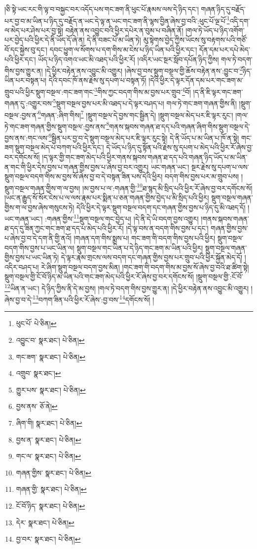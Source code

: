 །ཅི་སྟེ་ཡང་རང་གི་ལྟ་བ་བསྐྱང་བར་འདོད་པས་གང་ཟག་ནི་ཕུང་པོ་རྣམས་ལས་དེ་ཉིད་དང་། གཞན་ཉིད་དུ་བརྗོད་པར་བྱ་བ་མ་ཡིན་པ་ཉིད་དུ་བརྗོད་ན་ཡང་དེ་ལྟ་ན་ཡང་གང་ཟག་ནི་ལྷས་བྱིན་ཞེས་བྱ་བའི་:ཕུང་པོ་ལྔ་པོ་\footnote{ཕུང་པོ་  པེ་ཅིན། }འདི་དག་ལ་མེད་པར་ཤེས་པར་བྱ་སྟེ། བརྟེན་ནས་འབྱུང་བའི་ཕྱིར་དཔེར་ན་བུམ་པ་བཞིན་ནོ། །གལ་ཏེ་ཡོད་པ་ཉིད་འགོག་པར་བྱེད་པའི་ཕྱིར་དེ་ནི་ཡོད་དོ་ཞེ་ན། དེ་ནི་བཟང་པོ་མ་ཡིན་ཏེ། མུ་སྟེགས་བྱེད་ཀྱིས་ཡོངས་སུ་བརྟགས་པའི་གཙོ་བོ་དང་སྐྱེས་བུ་དང་། དབང་ཕྱུག་ལ་སོགས་པ་དག་གིས་མ་ངེས་པ་ཉིད་ཡིན་པའི་ཕྱིར་དང་། དོན་དམ་པར་དཔེ་མེད་པའི་ཕྱིར་དང་། ཡོད་པ་ཉིད་འགའ་ཡང་མི་འཐད་པའི་ཕྱིར་རོ། །འདིར་ཡང་སྔར་སློབ་དཔོན་ཉིད་ཀྱིས། གལ་ཏེ་བདག་གིས་བྱས་གྱུར་ན། །དེ་ཕྱིར་བརྟེན་ནས་འབྱུང་མི་འགྱུར། །ཞེས་བྱ་བས་སྡུག་བསྔལ་གྱི་ཆོས་བརྟེན་ནས་:བྱུང་བ་\footnote{འབྱུང་བ་  སྣར་ཐང་།  པེ་ཅིན། }ཉིད་ཡིན་པར་བསྟན་པ། དེའི་དབང་ཁོ་ནས་རྗེས་སུ་དཔག་པ་བསྟན་ཏོ། །དེའི་ཕྱིར་དེ་ལྟར་དོན་དམ་པར་གང་ཟག་མ་གྲུབ་པའི་ཕྱིར་སྡུག་བསྔལ་:གང་ཟག་གང་\footnote{གང་ཟག་  སྣར་ཐང་།  པེ་ཅིན། }གིས་ཀྱང་བདག་གིས་མ་བྱས་པར་གྲུབ་\footnote{འགྲུབ་  སྣར་ཐང་། }བོ། །ད་ནི་ཇི་ལྟར་གང་ཟག་གཞན་དུ་:འགྱུར་བས་\footnote{གྱུར་པས་  སྣར་ཐང་།  པེ་ཅིན། }སྡུག་བསྔལ་བྱས་པར་མི་འཐད་པ་དེ་ལྟར་བཤད་པ། གལ་ཏེ་གང་ཟག་གཞན་གྱིས་ནི། །སྡུག་བསྔལ་:བྱས་ན་\footnote{བྱས་ནས་  ཅོ་ནེ། }གཞན་:ཞིག་གིས།\footnote{ཞིག་གི།  སྣར་ཐང་།  པེ་ཅིན། } །སྡུག་བསྔལ་དེ་བྱས་གང་སྦྱིན་དེ། །སྡུག་བསྔལ་མེད་པར་ཇི་ལྟར་རུང་། །གལ་ཏེ་གང་ཟག་གཞན་གྱིས་སྡུག་བསྔལ་:བྱས་ནས་\footnote{བྱས་ན་  སྣར་ཐང་།  པེ་ཅིན། }གནས་སྐབས་གཞན་ཐ་དད་པའི་གཞན་ཞིག་གིས་སྡུག་བསྔལ་དེ་བྱས་ནས་:གང་ལས་\footnote{གང་ལ་  སྣར་ཐང་།  པེ་ཅིན། }སྦྱིན་པར་བྱ་བ་དེ་སྡུག་བསྔལ་མེད་པར་ཇི་ལྟར་རུང་སྟེ། དེ་ནི་ཡོད་པ་མ་ཡིན་པ་ཁོ་ན་སྟེ། གང་ཟག་སྡུག་བསྔལ་མེད་པ་བཀག་པའི་ཕྱིར་དང་། དེ་ཡོད་པ་ཉིད་དུ་སྟོན་པའི་རྗེས་སུ་དཔག་པ་མེད་པའི་ཕྱིར་རོ་ཞེས་བྱ་བར་དགོངས་སོ། །ད་ལྟར་གྱི་གང་ཟག་མེད་པའི་ཕྱིར་གནས་སྐབས་གཞན་ཐ་དད་པའི་གཞན་ཉིད་ཡོད་པ་མ་ཡིན་ན་གང་གི་ཕྱིར་དེས་བྱས་པ་གཞན་གྱིས་བྱས་པ་ཞེས་བྱ་བར་འགྱུར། ཡང་གཞན་ཡང་། སྔར་རྗེས་སུ་དཔག་པ་ལས་སྡུག་བསྔལ་བདག་གིས་མ་བྱས་སོ་ཞེས་བྱ་བ་དེ་བསྟན་ཟིན་པས་དེའི་ཕྱིར། བདག་གིས་བྱས་པར་མ་གྲུབ་པས། །སྡུག་བསྔལ་གཞན་གྱིས་ག་ལ་བྱས། །མ་བྱས་པ་ལ་:གཞན་གྱི་\footnote{གཞན་གྱིས་  སྣར་ཐང་།  པེ་ཅིན། }ཐ་སྙད་མི་སྲིད་པའི་ཕྱིར་རོ་ཞེས་བྱ་བར་དགོངས་སོ། །ཡང་ན་རྒྱུད་སོ་སོར་ངེས་པ་ལ་ལས་རྣམ་པར་སྨིན་པ་ཅན་གཞན་གྱིས་བྱེད་པ་མི་སྲིད་པའི་ཕྱིར། སྡུག་བསྔལ་གཞན་གྱིས་ག་ལ་བྱས་ཞེས་གསུངས་ཏེ། དེའི་ཕྱིར་དེ་ལྟར་སྡུག་བསྔལ་བདག་དང་གཞན་གྱིས་བྱས་པ་ཉིད་དུ་མི་འཐད་དོ། །ཡང་གཞན་ཡང་། :གཞན་གྱིས་\footnote{གཞན་གྱི་  སྣར་ཐང་།  པེ་ཅིན། }སྡུག་བསྔལ་གང་བྱེད་པ། །དེ་ནི་དེ་ཡི་བདག་བྱས་འགྱུར། །གནས་སྐབས་གཞན་ཐ་དད་དུ་ཟིན་ཀྱང་གང་ཟག་ཐ་དད་པ་མེད་པའི་ཕྱིར་རོ། །དེ་ལྟ་བས་ན་བདག་གིས་བྱས་པ་དང་། གཞན་གྱིས་བྱས་པ་ཞེས་བྱ་བ་དེ་དག་ནི་གྱི་ནའོ། །གཞན་དག་གིས་སྨྲས་པ། གང་ཟག་གི་བདག་གིས་བྱས་པའི་ཕྱིར། སྡུག་བསྔལ་བདག་གིས་བྱས་པ་ཡང་ཡིན་ལ། སྡུག་བསྔལ་གང་ཡིན་པ་དེ་ཉིད་གང་ཟག་མ་ཡིན་པའི་ཕྱིར། སྡུག་བསྔལ་གཞན་གྱིས་བྱས་པ་ཡང་ཡིན་ཏེ། དེ་ལྟར་རྣམ་གྲངས་ལས་བདག་དང་གཞན་གྱིས་བྱས་པར་གྲུབ་པའི་ཕྱིར་སྐྱོན་མེད་དོ། །འདིར་བཤད་པ། རེ་ཞིག་སྡུག་བསྔལ་བདག་བྱས་མིན། །གང་ཟག་གི་བདག་གིས་མ་བྱས་སོ་ཞེས་བྱ་བའི་ཐ་ཚིག་སྟེ། སྡུག་བསྔལ་གྱི་ངོ་བོ་ཉིད་མ་ཡིན་པའི་གང་ཟག་མེད་པའི་ཕྱིར་རོ་ཞེས་བྱ་བར་དགོངས་སོ། །སྡུག་བསྔལ་གྱི་:ངོ་བོ་\footnote{ངོ་བོ་ཉིད་  སྣར་ཐང་།  པེ་ཅིན། }ཡིན་ན་ཡང་། དེ་ཉིད་ཀྱིས་ནི་དེ་མ་བྱས། །གལ་ཏེ་བདག་གིས་བྱས་གྱུར་ན། །དེ་ཕྱིར་བརྟེན་ནས་འབྱུང་མི་འགྱུར། །ཞེས་བྱ་བ་དེ་\footnote{དེར་  སྣར་ཐང་།  པེ་ཅིན། }བཀག་ཟིན་པའི་ཕྱིར་རོ་ཞེས་:བྱ་བས་\footnote{བྱ་བར་  སྣར་ཐང་།  པེ་ཅིན། }དགོངས་སོ། །
